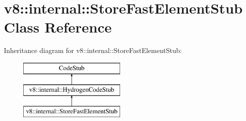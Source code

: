 \hypertarget{classv8_1_1internal_1_1_store_fast_element_stub}{}\section{v8\+:\+:internal\+:\+:Store\+Fast\+Element\+Stub Class Reference}
\label{classv8_1_1internal_1_1_store_fast_element_stub}
Inheritance diagram for v8\+:\+:internal\+:\+:Store\+Fast\+Element\+Stub\+:\begin{figure}[H]
\begin{center}
\leavevmode
\includegraphics[height=3.000000cm]{classv8_1_1internal_1_1_store_fast_element_stub}
\end{center}
\end{figure}
